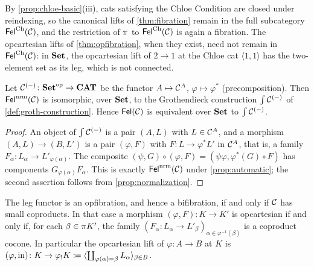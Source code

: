 \begin{remark}\label{rem:chloe-fibration}
By \cref{prop:chloe-basic}(iii), cats satisfying the Chloe Condition are closed
under reindexing, so the canonical lifts of \cref{thm:fibration} remain in the
full subcategory $\mathsf{Fel}^{\mathrm{Ch}}(\mathcal{C})$, and the restriction of $\pi$ to
$\mathsf{Fel}^{\mathrm{Ch}}(\mathcal{C})$ is again a fibration. The opcartesian lifts of
\cref{thm:opfibration}, when they exist, need not remain in $\mathsf{Fel}^{\mathrm{Ch}}(\mathcal{C})$: in
$\mathbf{Set}$, the opcartesian lift of $2\to1$ at the Chloe cat $\langle1,1\rangle$ has
the two-element set as its leg, which is not connected.
\end{remark}


\begin{proposition}\label{prop:groth}
Let $\mathcal{C}^{(-)}\colon\mathbf{Set}^{\mathrm{op}}\to\mathbf{CAT}$ be the functor $A\mapsto\mathcal{C}^A$,
$\varphi\mapsto\varphi^*$ (precomposition). Then $\mathsf{Fel}^{\mathrm{nrm}}(\mathcal{C})$ is isomorphic,
over $\mathbf{Set}$, to the Grothendieck construction $\textstyle\int\mathcal{C}^{(-)}$ of
\cref{def:groth-construction}. Hence $\mathsf{Fel}(\mathcal{C})$ is equivalent over $\mathbf{Set}$ to
$\textstyle\int\mathcal{C}^{(-)}$.
\end{proposition}

\begin{proof}
An object of $\textstyle\int\mathcal{C}^{(-)}$ is a pair $(A,L)$ with $L\in\mathcal{C}^A$, and a morphism
$(A,L)\to(B,L')$ is a pair $(\varphi,F)$ with $F\colon L\to\varphi^*L'$ in $\mathcal{C}^A$,
that is, a family $F_\alpha\colon L_\alpha\to L'_{\varphi(\alpha)}$. The composite
$(\psi,G)\circ(\varphi,F)=(\psi\varphi,\varphi^*(G)\circ F)$ has components
$G_{\varphi(\alpha)}F_\alpha$. This is exactly $\mathsf{Fel}^{\mathrm{nrm}}(\mathcal{C})$ under
\cref{prop:automatic}; the second assertion follows from
\cref{prop:normalization}.
\end{proof}

\begin{theorem}\label{thm:opfibration}
The leg functor is an opfibration, and hence a bifibration, if and only if
$\mathcal{C}$ has small coproducts. In that case a morphism $(\varphi,F)\colon K\to K'$
is opcartesian if and only if, for each $\beta\in\pi K'$, the family
$(F_\alpha\colon L_\alpha\to L'_\beta)_{\alpha\in\varphi^{-1}(\beta)}$ is a
coproduct cocone. In particular the opcartesian lift of $\varphi\colon A\to B$
at $K$ is $(\varphi,\mathrm{in})\colon K\to\varphi_!K\coloneqq\langle\coprod_{\varphi(\alpha)=\beta}L_\alpha\rangle_{\beta\in B}$.
\end{theorem}

